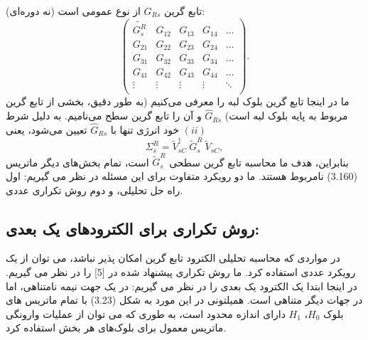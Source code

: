 تابع گرین $G_{Rs}$ از نوع عمومی است (نه دوره‌ای):
\begin{equation}
    \left( \begin{matrix}
           \widetilde{G_{s}^{R}} & {{G}_{12}} & {{G}_{13}} & {{G}_{14}} & \ldots   \\
           {{G}_{21}} & {{G}_{22}} & {{G}_{23}} & {{G}_{24}} & \ldots   \\
           {{G}_{31}} & {{G}_{32}} & {{G}_{33}} & {{G}_{34}} & \ldots   \\
           {{G}_{41}} & {{G}_{42}} & {{G}_{43}} & {{G}_{44}} & \ldots   \\
           \vdots  & \vdots  & \vdots  & \vdots  & \ddots   \\
        \end{matrix} \right).
\end{equation}
ما در اینجا تابع گرین بلوک لبه را معرفی می‌کنیم (به طور دقیق، بخشی از تابع گرین مربوط به پایه بلوک لبه است) $\hat{G}_{Rs}$ و آن را تابع گرین سطح می‌نامیم. به دلیل شرط $(ii)$ خود انرژی تنها با $\hat{G}_{Rs}$ تعیین می‌شود، یعنی
\begin{equation}
    \Sigma _{s}^{R}=\tilde{V}_{sC}^{\dagger }\ \tilde{G}_{s}^{R}\ {{\tilde{V}}_{sC}},
\end{equation}
بنابراین، هدف ما محاسبه تابع گرین سطحی $\tilde{G}^R_s$ است، تمام بخش‌های دیگر ماتریس (3.160) نامربوط هستند. ما دو رویکرد متفاوت برای این مسئله در نظر می گیریم: اول راه حل تحلیلی، و دوم روش تکراری عددی.

\subsection{روش تکراری برای الکترودهای یک بعدی:}
در مواردی که محاسبه تحلیلی الکترود تابع گرین امکان پذیر نباشد، می توان از یک رویکرد عددی استفاده کرد. ما روش تکراری پیشنهاد شده در [5] را در نظر می گیریم. در اینجا ابتدا یک الکترود یک بعدی را در نظر می گیریم: در یک جهت نیمه نامتناهی، اما در جهات دیگر متناهی است. همیلتونی در این مورد به شکل (3.23) با تمام ماتریس های بلوک $H_0$، $H_1$ دارای اندازه محدود است، به طوری که می توان از عملیات وارونگی ماتریس معمول برای بلوک‌های هر بخش استفاده کرد.

